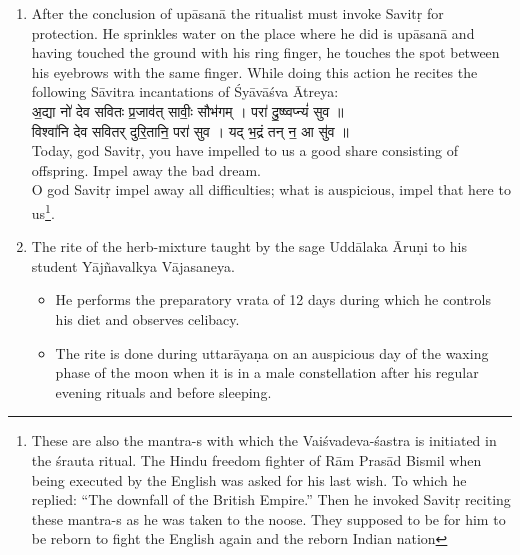 \documentclass[12pt]{article}
\begin{document}
\begin{enumerate}
{\skt 
शुची॑ वो ह॒व्या म॑रुतः॒ शुची॑नां॒ \\
शुचिं॑ हिनोम्य् अध्व॒रं शुचि॑भ्यः ।\\
ऋ॒तेन॑ स॒त्यम् ऋ॑त॒साप॑ आय॒ञ् \\
 छुचि॑जन्मानः॒ शुच॑यः पाव॒काः ॥
}\\[8pt]
Pure oblations to you O Marut-s, the pure ones;\\
A pure ritual I offer to the pure ones;\\
By the ṛta the ṛta-knowers have attained truth,\\
of pure birth, they who are pure, the purifiers.\\
\item After the conclusion of upāsanā the ritualist must invoke Savitṛ for protection. He sprinkles water on the place where he did is upāsanā and having touched the ground with his ring finger, he touches the spot between his eyebrows with the same finger. While doing this action he recites the following Sāvitra incantations of Śyāvāśva Ātreya:\\[8pt]
{\skt
अ॒द्या नो॑ देव सवितः प्र॒जाव॑त् सावीः॒ सौभ॑गम् । परा॑ दु॒ष्ष्वप्न्यं॑ सुव ॥\\
विश्वा॑नि देव सवितर् दुरि॒तानि॒ परा॑ सुव । यद् भ॒द्रं तन् न॒ आ सु॑व ॥
}\\[8pt]
Today, god Savitṛ, you have impelled to us a good share consisting of offspring. Impel away the bad dream.\\
O god Savitṛ  impel away all difficulties; what is auspicious,  impel that here to us\footnote {These are also the mantra-s with which the Vaiśvadeva-śastra is initiated in the śrauta ritual. The Hindu freedom fighter of Rām Prasād Bismil when being executed by the English was asked for his last wish. To which he replied: ``The downfall of the British Empire.'' Then he invoked Savitṛ reciting these mantra-s as he was taken to the noose. They supposed to be for him to be reborn to fight the English again and the reborn Indian nation}.
\item The rite of the herb-mixture taught by the sage Uddālaka Āruṇi to his student Yājñavalkya Vājasaneya. 
\begin{itemize}
\item He performs the preparatory vrata of 12 days during which he controls his diet and observes celibacy.
\item The rite is done during uttarāyaṇa on an auspicious day of the waxing phase of the moon when it is in a male constellation after his regular evening rituals and before sleeping. 

\end{itemize}
\end{enumerate}
\end{document}
